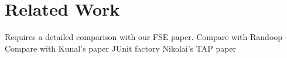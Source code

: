 \section{Related Work}
\label{sec:related}

Requires a detailed comparison with our FSE paper.
Compare with Randoop
Compare with Kunal's paper
JUnit factory
Nikolai's TAP paper